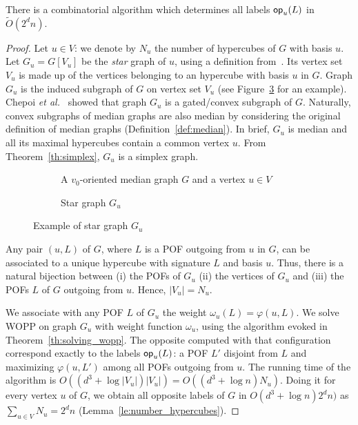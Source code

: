 \documentclass[a4paper,UKenglish,numberwithinsect,cleveref, autoref,anonymous]{lipics-v2021}
\newcommand{\card}[1]{\left| #1 \right|}
\newcommand{\opp}{\mbox{\textsf{op}}}
\begin{document}
\begin{theorem}[Computation of labels \opp]
There is a combinatorial algorithm which determines all labels $\opp_u(L)$ in $\tilde{O}(2^dn)$. 
\label{th:compute_opp}
\end{theorem}
\begin{proof}
Let $u \in V$: we denote by $N_u$ the number of hypercubes of $G$ with basis $u$. Let $G_u =  G\left[V_u\right]$ be the \textit{star} graph of $u$, using a definition from~\cite{ChLaRa19}. Its vertex set $V_u$ is made up of the vertices belonging to an hypercube with basis $u$ in $G$. Graph $G_u$ is the induced subgraph of $G$ on vertex set $V_u$ (see Figure~\ref{fig:compute_opposites} for an example). Chepoi {\em et al.}~\cite{ChLaRa19} showed that graph $G_u$ is a gated/convex subgraph of $G$. Naturally, convex subgraphs of median graphs are also median by considering the original definition of median graphs (Definition~\ref{def:median}). In brief, $G_u$ is median and all its maximal hypercubes contain a common vertex $u$. From Theorem~\ref{th:simplex}, $G_u$ is a simplex graph.

\begin{figure}[h]
\centering
\begin{subfigure}[b]{0.54\columnwidth}
\centering
\scalebox{0.8}{}
\caption{A $v_0$-oriented median graph $G$ and a vertex $u \in V$}
\label{subfig:compute_opposites_1}
\end{subfigure}
\begin{subfigure}[b]{0.44\columnwidth}
\centering
\scalebox{0.8}{}
\caption{Star graph $G_u$}
\label{subfig:compute_opposites_2}
\end{subfigure}

\caption{Example of star graph $G_u$}
\label{fig:compute_opposites}
\end{figure}

Any pair $(u,L)$ of $G$, where $L$ is a POF outgoing from $u$ in $G$, can be associated to a unique hypercube with signature $L$ and basis $u$. Thus, there is a natural bijection between (i) the POFs of $G_u$ (ii) the vertices of $G_u$ and (iii) the POFs $L$ of $G$ outgoing from $u$. Hence, $\card{V_u} = N_u$.

We associate with any POF $L$ of $G_u$ the weight $\omega_u(L) = \varphi(u,L)$. We solve WOPP on graph $G_u$ with weight function $\omega_u$, using the algorithm evoked in Theorem~\ref{th:solving_wopp}. The opposite computed with that configuration correspond exactly to the labels $\opp_u(L)$: a POF $L'$ disjoint from $L$ and maximizing $\varphi(u,L')$ among all POFs outgoing from $u$. The running time of the algorithm is $O((d^3+\log \card{V_u})\card{V_u}) = O((d^3+\log n)N_u)$. Doing it for every vertex $u$ of $G$, we obtain all opposite labels of $G$ in $O(d^3+\log n)2^dn)$ as $\sum_{u \in V} N_u = 2^dn$ (Lemma~\ref{le:number_hypercubes}).
\end{proof}
\end{document}
